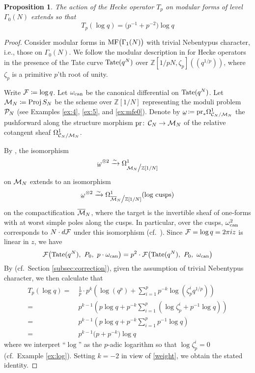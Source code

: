 \documentclass{gtpart}
\newtheorem{prop}[equation]{Proposition}
\theoremstyle{definition}
\theoremstyle{remark}
\def\co{\colon\thinspace}
\newcommand{\mb}[1]{\mathbb{#1}}
\newcommand{\Proj}{{\rm Proj\thinspace}}
\newcommand{\CC}{{\cal C}}
\newcommand{\CF}{{\cal F}}
\newcommand{\CM}{{\cal M}}
\newcommand{\CMB}{\overline {\cal M}}
\newcommand{\CP}{{\cal P}}
\newcommand{\BZ}{{\mb Z}}
\newcommand{\can}{{\rm can}}
\newcommand{\MF}{{\rm MF}}
\newcommand{\G}{\Gamma}
\renewcommand{\o}{\omega}
\newcommand{\ou}{\underline{\omega\!}}
\newcommand{\ce}{\coloneqq}
\newcommand{\lp}{(\!(}
\newcommand{\rp}{)\!)}
\renewcommand{\=}{\approx}
\renewcommand{\-}{\sim}
\newcommand{\Tate}{{\rm Tate}}
\numberwithin{equation}{section}
\begin{document}
\begin{prop}
 \label{prop:logq}
 The action of the Hecke operator $T_p$ on modular forms of level $\G_0(N)$ 
 extends so that 
 \[
  T_p (\log q) = \big( p^{-1} + p^{-2} \big) \log q 
 \]
\end{prop}

\begin{proof}
 Consider modular forms in $\MF\big(\G_1(N)\big)$ with trivial Nebentypus 
 character, i.e., those on $\G_0(N)$.  We follow the modular description in 
 \cite[Section 1.11]{padicprop} for Hecke operators in the presence of the Tate 
 curve $\Tate(q^N)$ over $\BZ [1/pN, \zeta_p] \lp q^{1/p} \rp$, where $\zeta_p$ 
 is a primitive $p$'th root of unity.  

 Write $\CF \ce \log q$.  Let $\o_\can$ be the canonical differential on 
 $\Tate(q^N)$.  Let $\CM_N \ce \Proj S_N$ be the scheme over $\BZ[1/N]$ 
 representing the moduli problem $\CP_N$ (see Examples \ref{ex:4}, \ref{ex:5}, 
 and \ref{ex:mfe0}).  Denote by $\ou \ce {\rm pr}_* \Omega^1_{\CC_N/\CM_N}$ the 
 pushforward along the structure morphism ${\rm pr} \co \CC_N \to \CM_N$ of the 
 relative cotangent sheaf $\Omega^1_{\CC_N/\CM_N}$.  

 By \cite[Theorem 10.13.11]{KM}, the isomorphism 
 \[
  \ou^{~\! \otimes 2} \xrightarrow{\sim} \Omega^1_{\CM_N \big/ \BZ[1/N]} 
 \]
 on $\CM_N$ extends to an isomorphism 
 \[
  \ou^{~\! \otimes 2} \xrightarrow{\sim} 
  \Omega^1_{\CMB_N \big/ \BZ[1/N]} (\text{log cusps}) 
 \]
 on the compactification $\CMB_N$, where the target is the invertible sheaf of 
 one-forms with at worst simple poles along the cusps.  In particular, over the 
 cusps, $\o_\can^2$ corresponds to $N \cdot d\CF$ under this isomorphism 
 (cf.~\cite[Section 1.5]{padicprop}).  Since $\CF = \log q = 2 \pi i z$ is 
 linear in $z$, we have 
 \begin{equation}
  \label{weight}
  \CF \big( \Tate(q^N), ~ P_0, ~ p \cdot \o_\can \big) = 
  p^2 \cdot \CF \big( \Tate(q^N), ~ P_0, ~ \o_\can \big) 
 \end{equation}
 By \cite[(1.11.0.3) and (1.11.0.4)]{padicprop} (cf.~Section 
 \ref{subsec:correction}), given the assumption of trivial Nebentypus character, 
 we then calculate that 
 \begin{equation}
  \label{Tplogq}
  \begin{split}
   T_p (\log q) = & ~ \frac{1}{p}\cdot p^k \left( \log(q^p) + \sum_{i = 1}^p 
                    p^{-k} \log(\zeta_p^i q^{1/p}) \right) \\
                = & ~ p^{k - 1} \left( p \log q + p^{-k} \sum_{i = 1}^p 
                    (\log \zeta_p^i + p^{-1} \log q) \right) \\
                = & ~ p^{k - 1} \left( p \log q + p^{-k} \sum_{i = 1}^p 
                    p^{-1} \log q \right) \\
                = & ~ p^{k - 1} \big( p + p^{-k} \big) \log q 
  \end{split}
 \end{equation}
 where we interpret ``$\log$'' as the $p$-adic logarithm so that 
 $\log \zeta_p^i = 0$ (cf.~Example \ref{ex:log}).  Setting $k = -2$ in view of 
 \eqref{weight}, we obtain the stated identity.  
\end{proof}
\end{document}
